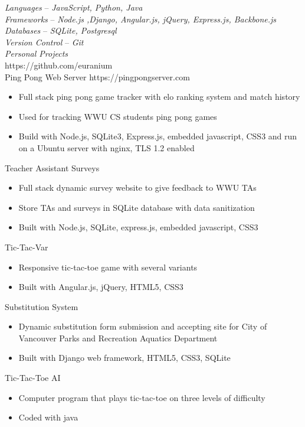 \documentclass[line,margin]{res}
\begin{document}
\begin{resume}
	{\sl Languages} -- {\sl JavaScript, Python, Java}\\
	{\sl Frameworks} -- {\sl Node.js ,Django, Angular.js, jQuery, Express.js, Backbone.js} \\
	{\sl Databases} -- {\sl SQLite, Postgresql} \\
	{\sl Version Control} -- {\sl Git}\\
	{\sl Personal Projects}\\
	{\footnotesize https://github.com/euranium}\\
	Ping Pong Web Server {\footnotesize https://pingpongserver.com}
\begin{itemize}\itemsep -2pt
		\item Full stack ping pong game tracker with elo ranking system and match history
		\item Used for tracking WWU CS students ping pong games
		\item Build with Node.js, SQLite3, Express.js, embedded javascript, CSS3 and run on a Ubuntu server with nginx, TLS 1.2 enabled
	\end{itemize}
	Teacher Assistant Surveys
	\begin{itemize} \itemsep -2pt
		\item Full stack dynamic survey website to give feedback to WWU TAs
		\item Store TAs and surveys in SQLite database with data sanitization
		\item Built with Node.js, SQLite, express.js, embedded javascript, CSS3
	\end{itemize}
	Tic-Tac-Var
	\begin{itemize} \itemsep -2pt
		\item Responsive tic-tac-toe game with several variants
		\item Built with Angular.js, jQuery, HTML5, CSS3
	\end{itemize}
	Substitution System
	\begin{itemize} \itemsep -2pt
		\item Dynamic substitution form submission and accepting site for City of Vancouver Parks and Recreation Aquatics Department
		\item Built with Django web framework, HTML5, CSS3, SQLite
	\end{itemize}
	Tic-Tac-Toe AI
	\begin{itemize} \itemsep -2pt
		\item Computer program that plays tic-tac-toe on three levels of difficulty
		\item Coded with java
	\end{itemize}


\end{resume}
\end{document}
